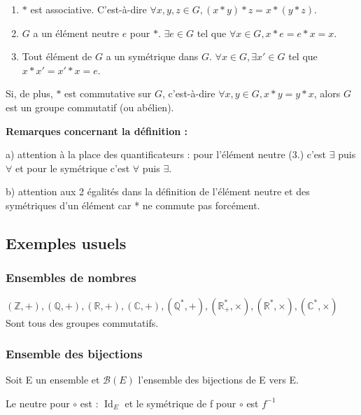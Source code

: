 \documentclass[12pt,a4paper,french]{book}
\begin{document}
\begin{spacing}{1.0}
\begin{spacing}{1.0}
{\begin{minipage}{\textwidth}
\begin{enumerate}[itemsep=2pt, topsep=1pt, partopsep=0pt, parsep=1pt]
						\item \( * \) est associative. C'est-à-dire \(\forall x, y, z \in G, (x * y) * z = x * (y * z)\).
						
						\item \( G \) a un élément neutre \( e \) pour \( * \). \(\exists e \in G\) tel que \(\forall x \in G, x * e = e * x = x\).
						
						\item Tout élément de \( G \) a un symétrique dans \( G \). \(\forall x \in G, \exists x' \in G\) tel que \(x * x' = x' * x = e\).
					\end{enumerate}
				\end{minipage}
			}
			
			Si, de plus, \( * \) est commutative sur \( G \), c'est-à-dire \(\forall x, y \in G, x * y = y * x\), alors \( G \) est un groupe commutatif (ou abélien).
			
			\textbf{Remarques concernant la définition :}
			 
			a) attention à la place des quantificateurs : pour l'élément neutre (3.) c'est \(\exists\) puis \(\forall\) et pour le symétrique c'est \(\forall\) puis \(\exists\).
			
			b) attention aux 2 égalités dans la définition de l'élément neutre et des symétriques d'un élément car * ne commute pas forcément.
		\end{spacing}
		\subsection{Exemples usuels}
			\subsubsection{Ensembles de nombres}
			\((\mathbb{Z}, +), (\mathbb{Q}, +), (\mathbb{R}, +), (\mathbb{C}, +), (\mathbb{Q}^*, +), (\mathbb{R}^*_+, \times), (\mathbb{R}^*, \times), (\mathbb{C}^*, \times)\)
			Sont tous des groupes commutatifs.
			\subsubsection{Ensemble des bijections}
			\begin{spacing}{1.0}
			Soit E un ensemble et \(\mathscr{B}(E)\) l'ensemble des bijections de E vers E.
			\begin{center}
			\end{center}
			Le neutre pour \(\circ\) est  : \(\operatorname{Id}_E\) et le symétrique de f pour \(\circ\) est \(f^{-1}\)
			\end{spacing}

\end{spacing}
\end{document}
